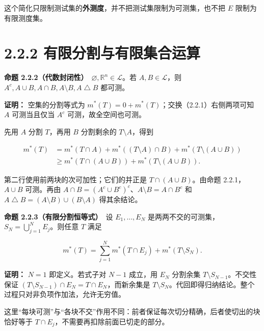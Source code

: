 \documentclass[11pt,a4paper]{article}
\begin{document}
这个简化只限制测试集的\textbf{外测度}，并不把测试集限制为可测集，也不把
\(E\) 限制为有限测度集。

\section[\S{}2.2.2
有限分割与有限集合运算]{2.2.2
有限分割与有限集合运算}\label{ux6709ux9650ux5206ux5272ux4e0eux6709ux9650ux96c6ux5408ux8fd0ux7b97}

\textbf{命题
2.2.2（代数封闭性）}　\(\varnothing,\mathbb R^n\in\mathcal L\)。若
\(A,B\in\mathcal L\)，则
\(A^c,A\cup B,A\cap B,A\setminus B,A\mathbin{\triangle}B\) 都可测。

\textbf{证明：} 空集的分割等式为
\(m^*(T)=0+m^*(T)\)；交换（2.2.1）右侧两项可知 \(A\) 可测当且仅当
\(A^c\) 可测，故全空间也可测。

先用 \(A\) 分割 \(T\)，再用 \(B\) 分割剩余的 \(T\setminus A\)，得到

\begin{equation*}
\begin{aligned}
m^*(T)
&=m^*(T\cap A)+m^*((T\setminus A)\cap B)
  +m^*(T\setminus(A\cup B))\\
&\ge m^*(T\cap(A\cup B))+m^*(T\setminus(A\cup B)).
\end{aligned}
\tag{2.2.3}
\end{equation*}

第二行使用前两块的次可加性；它们的并正是 \(T\cap(A\cup B)\)。由命题
2.2.1，\(A\cup B\) 可测。再由
\(A\cap B=(A^c\cup B^c)^c\)、\(A\setminus B=A\cap B^c\) 和
\(A\mathbin{\triangle}B=(A\setminus B)\cup(B\setminus A)\) 得其余结论。

\textbf{命题 2.2.3（有限分割恒等式）}　设 \(E_1,\ldots,E_N\)
是两两不交的可测集，\(S_N=\bigcup_{j=1}^N E_j\)。则任意 \(T\) 满足

\begin{equation*}
m^*(T)=\sum_{j=1}^N m^*(T\cap E_j)+m^*(T\setminus S_N).
\tag{2.2.4}
\end{equation*}

\textbf{证明：} \(N=1\) 即定义。若式子对 \(N-1\) 成立，用 \(E_N\)
分割余集 \(T\setminus S_{N-1}\)。不交性保证
\((T\setminus S_{N-1})\cap E_N=T\cap E_N\)，而新余集是
\(T\setminus S_N\)。代回即得归纳结论。整个过程只对非负项作加法，允许无穷值。

这里``每块可测''与``各块不交''作用不同：前者保证每次切分精确，后者使切出的块恰好等于
\(T\cap E_j\)，不需要再扣除前面已切走的部分。
\end{document}
